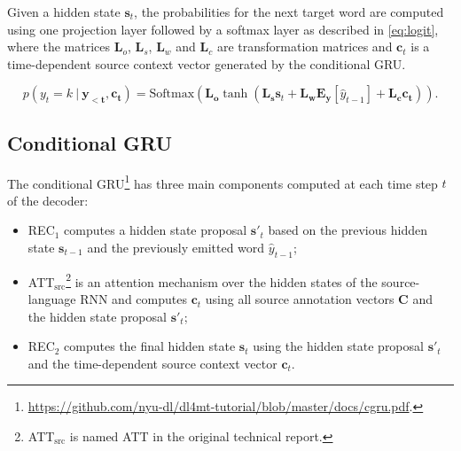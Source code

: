 \documentclass[11pt]{article}
\newcommand\given[1][]{\:#1\vert\:}
\begin{document}
Given a hidden state $\bm{s}_t$,
the probabilities for the next target word
are computed using one projection layer followed by a softmax layer as described in \cref{eq:logit},
where the matrices $\bm{L}_o$, $\bm{L}_s$, $\bm{L}_w$ and $\bm{L}_c$ are transformation matrices and $\bm{c}_t$ is a time-dependent source context vector generated by the conditional GRU.


\begin{figure*}[ht!]\vspace{-10px}
\begin{equation}
  \label{eq:logit}
  p(y_t = k \given \bm{y_{<t}}, \bm{c_t}) =
  \text{Softmax}(\bm{L_o} \tanh( \bm{L_s} \bm{s}_t +
\bm{L_w} \bm{E_y}[\hat{y}_{t-1}] +
                        \bm{L_c} \bm{c_t} ) ).
\end{equation}
\end{figure*}




\subsection{Conditional GRU}
\label{sec:sentence_context}

The conditional GRU\footnote{\url{https://github.com/nyu-dl/dl4mt-tutorial/blob/master/docs/cgru.pdf}.} has three main components computed at each time step $t$ of the decoder:
\begin{itemize}
  \setlength\itemsep{0em}
  \item REC$_1$ computes a hidden state proposal $\bm{s}'_t$ based on the previous hidden state $\bm{s}_{t-1}$ and the previously emitted word $\hat{y}_{t-1}$;
  
  \item ATT$_\text{src}$\footnote{ATT$_\text{src}$ is named ATT in the original technical report.} is an attention mechanism over the hidden states of the source-language RNN and computes $\bm{c}_t$ using all source annotation vectors $\bm{C}$ and the hidden state proposal $\bm{s}'_t$;
  
  \item REC$_2$ computes the final hidden state $\bm{s}_t$ using the hidden state proposal $\bm{s}'_t$ and the time-dependent source context vector $\bm{c}_t$.
\end{itemize}
\end{document}
